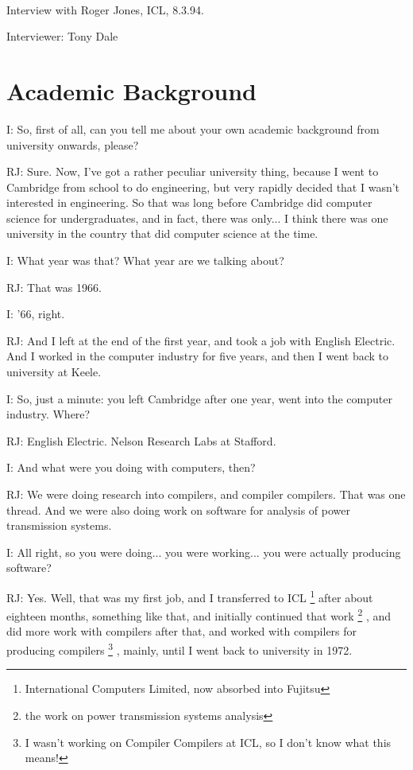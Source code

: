 \documentclass[10pt,titlepage]{book}
\begin{document}
\ \\

Interview with Roger Jones, ICL, 8.3.94.

Interviewer: Tony Dale 

\section{Academic Background} 

I: So, first of all, can you tell me about your own academic background from university onwards, please?

RJ: Sure. Now, I've got a rather peculiar university thing, because I went to Cambridge from school to do engineering, but very rapidly decided that I wasn't interested in engineering. So that was long before Cambridge did computer science for undergraduates, and in fact, there was only... I think there was one university in the country that did computer science at the time.

I: What year was that? What year are we talking about?

RJ: That was 1966.

I: '66, right.

RJ: And I left at the end of the first year, and took a job with English Electric. And I worked in the computer industry for five years, and then I went back to university at Keele.

I: So, just a minute: you left Cambridge after one year, went into the computer industry. Where?

RJ: English Electric. Nelson Research Labs at Stafford.

I: And what were you doing with computers, then?

RJ: We were doing research into compilers, and compiler compilers. That was one thread. And we were also doing work on software for analysis of power transmission systems.

I: All right, so you were doing... you were working... you were actually producing software?

RJ: Yes. Well, that was my first job, and I transferred to ICL%
\footnote{
International Computers Limited, now absorbed into Fujitsu}%
after about eighteen months, something like that, and initially continued that work%
\footnote{
the work on power transmission systems analysis}%
, and did more work with compilers after that, and worked with compilers for producing compilers%
\footnote{
I wasn't working on Compiler Compilers at ICL, so I don't know what this means!}%
, mainly, until I went back to university in 1972.
\end{document}
